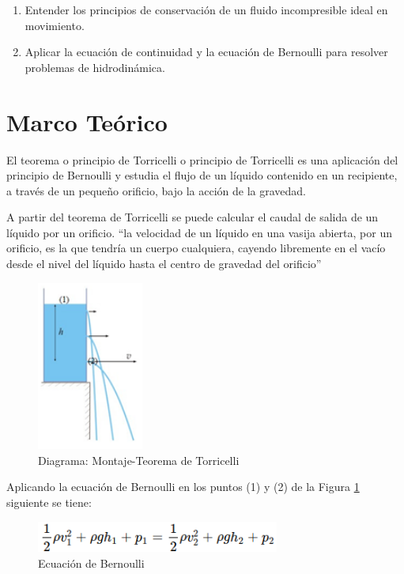 \documentclass[journal,transmag]{IEEEtran}
\begin{document}
\begin{enumerate}
	
    \item Entender los principios de conservación de un fluido incompresible ideal en movimiento. 
    
    \item Aplicar la ecuación de continuidad y la ecuación de Bernoulli para resolver problemas de hidrodinámica.

	\end{enumerate}
\section{Marco Teórico}

 El teorema o principio de Torricelli o principio de Torricelli es una aplicación del principio de Bernoulli y estudia el flujo de un líquido contenido en un recipiente, a través de un pequeño orificio, bajo la acción de la gravedad.  

A partir del teorema de Torricelli se puede calcular el caudal de salida de un líquido por un orificio. “la velocidad de un líquido en una vasija abierta, por un orificio, es la que tendría un cuerpo cualquiera, cayendo libremente en el vacío desde el nivel del líquido hasta el centro de gravedad del orificio”
 
 \begin{figure}[!h]
\center
\includegraphics[width=3.5cm]{imagen7.png}
\caption{Diagrama: Montaje-Teorema de Torricelli}
\label{6}
\end{figure}

Aplicando la ecuación de Bernoulli en los puntos (1) y (2) de la Figura \ref{6} siguiente se tiene: 
 
  \begin{figure}[!h] 
\center
\includegraphics[width=8cm]{imagen8.png}
\caption{Ecuación de Bernoulli}
\label{7}
\end{figure} 
\end{document}
